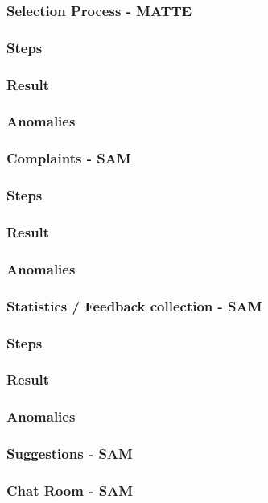 \subsubsection{Selection Process - MATTE}
\subsubsection*{Steps}
\subsubsection*{Result}
\subsubsection*{Anomalies}
\subsubsection{Complaints - SAM}
\subsubsection*{Steps}
\subsubsection*{Result}
\subsubsection*{Anomalies}
\subsubsection{Statistics / Feedback collection - SAM}
\subsubsection*{Steps}
\subsubsection*{Result}
\subsubsection*{Anomalies}
\subsubsection{Suggestions - SAM} 
\subsubsection{Chat Room - SAM} 




